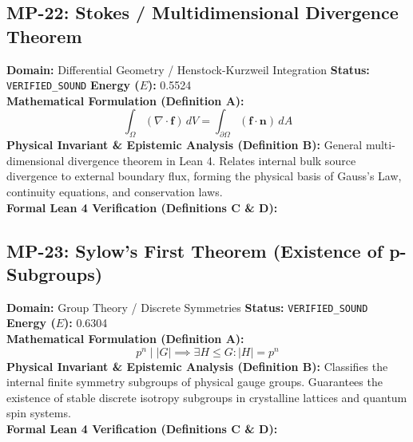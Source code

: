 \vspace{1em}
\subsection{MP-22: Stokes / Multidimensional Divergence Theorem}
\textbf{Domain:} Differential Geometry / Henstock-Kurzweil Integration \hfill \textbf{Status:} \texttt{VERIFIED\_SOUND} \hfill \textbf{Energy ($E$):} 0.5524\\
\textbf{Mathematical Formulation (Definition A):}
\begin{equation*}
\int_{\Omega} (\nabla \cdot \mathbf{f})\, dV = \int_{\partial \Omega} (\mathbf{f} \cdot \mathbf{n})\, dA
\end{equation*}
\textbf{Physical Invariant \& Epistemic Analysis (Definition B):}
General multi-dimensional divergence theorem in Lean 4. Relates internal bulk source divergence to external boundary flux, forming the physical basis of Gauss's Law, continuity equations, and conservation laws.\\

\textbf{Formal Lean 4 Verification (Definitions C \& D):}


\vspace{1em}
\subsection{MP-23: Sylow's First Theorem (Existence of p-Subgroups)}
\textbf{Domain:} Group Theory / Discrete Symmetries \hfill \textbf{Status:} \texttt{VERIFIED\_SOUND} \hfill \textbf{Energy ($E$):} 0.6304\\
\textbf{Mathematical Formulation (Definition A):}
\begin{equation*}
p^n \mid |G| \implies \exists H \le G: |H| = p^n
\end{equation*}
\textbf{Physical Invariant \& Epistemic Analysis (Definition B):}
Classifies the internal finite symmetry subgroups of physical gauge groups. Guarantees the existence of stable discrete isotropy subgroups in crystalline lattices and quantum spin systems.\\

\textbf{Formal Lean 4 Verification (Definitions C \& D):}


\vspace{1em}
